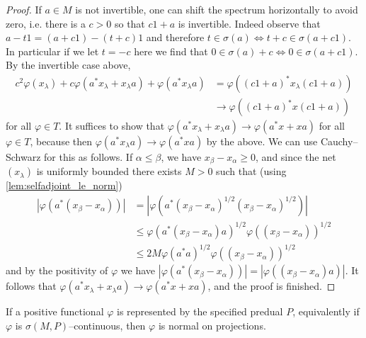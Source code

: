 \begin{proof}
  If $a\in M$ is not invertible, one can shift the spectrum horizontally to avoid zero, i.e. there is a $c>0$ so that $c1+a$ is invertible. Indeed
  observe that $a-t1=(a+c1)-(t+c)1$ and therefore $t\in \sigma(a)\iff t+c \in \sigma(a+c1)$. In particular if we let $t=-c$ here we find that
  $0\in \sigma(a)+c \iff 0 \in \sigma(a+c1)$.
  By the invertible case above, 
  \begin{align}
    c^2\varphi(x_{\lambda})+c\varphi(a^{*}x_{\lambda}+x_{\lambda}a)+\varphi(a^{*}x_{\lambda}a)&=\varphi((c1+a)^{*}x_{\lambda}(c1+a))\\\nonumber
    &\to \varphi((c1+a)^{*}x(c1+a))
  \end{align}
  for all $\varphi\in T$. 
  It suffices to show that $\varphi(a^{*}x_{\lambda}+x_{\lambda}a)\to \varphi(a^{*}x+xa)$ for all $\varphi\in T$, 
  because then $\varphi(a^{*}x_{\lambda}a)\to \varphi(a^{*}xa)$ by the above. We can use Cauchy--Schwarz for this as follows. If $\alpha\le \beta$,
  we have $x_{\beta}-x_{\alpha}\ge 0$, and since the net $(x_{\lambda})$ is uniformly bounded there exists $M>0$ such that (using \ref{lem:selfadjoint_le_norm})
  \begin{align}
    |\varphi(a^{*}(x_{\beta}-x_{\alpha}))|&=|\varphi(a^{*}(x_{\beta}-x_{\alpha})^{1/2}(x_{\beta}-x_{\alpha})^{1/2})|\\\nonumber
                                          &\le \varphi(a^{*}(x_{\beta}-x_{\alpha})a)^{1/2}\varphi((x_{\beta}-x_{\alpha}))^{1/2}\\\nonumber
                                          &\le 2M\varphi(a^{*}a)^{1/2}\varphi((x_{\beta}-x_{\alpha}))^{1/2}
  \end{align}
  and by the positivity of $\varphi$ we have $|\varphi(a^{*}(x_{\beta}-x_{\alpha}))|=|\varphi((x_{\beta}-x_{\alpha})a)|$.
  It follows that $\varphi(a^{*}x_{\lambda}+x_{\lambda}a)\to \varphi(a^{*}x+xa)$, and the proof is finished.
\end{proof}

\begin{theorem}
  \label{thm:uw_continuous_is_normal}
  \leanok
  If a positive functional $\varphi$ is represented by the specified predual $P$, equivalently if
  $\varphi$ is $\sigma(M,P)$--continuous, then $\varphi$ is normal on projections.
\end{theorem}

